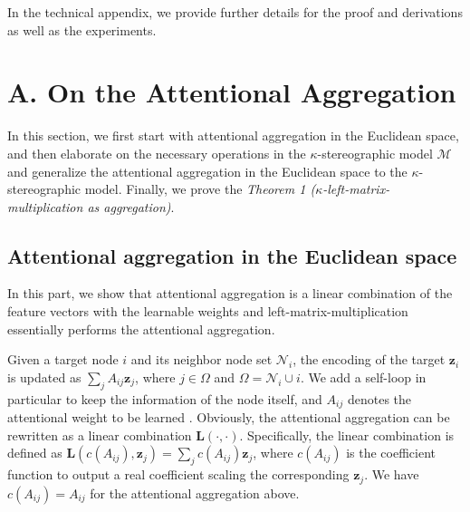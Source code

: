
In the technical appendix, we provide further details for the proof and derivations as well as the experiments.

\section{A. On the Attentional Aggregation}
In this section, we first start with attentional aggregation in the Euclidean space, 
and then elaborate on the necessary operations in the $\kappa$-stereographic model $\mathcal M$ and generalize the attentional aggregation in the Euclidean space to the $\kappa$-stereographic model.
Finally, we prove the \emph{Theorem 1 ($\kappa$-left-matrix-multiplication as aggregation)}.

\subsection{Attentional aggregation in the Euclidean space}
In this part, we show that attentional aggregation is a linear combination of the  feature vectors with the learnable weights and left-matrix-multiplication essentially performs the attentional aggregation.

Given a target node $i$ and its neighbor node set $\mathcal N_i$, 
the encoding of the target $\boldsymbol z_i$  is updated as 
$\sum\nolimits_j A_{ij}\boldsymbol z_j$,
where $j \in \Omega$ and $\Omega =\mathcal N_i \cup i$. We add a self-loop in particular to keep the information of the node itself, and $A_{ij}$ denotes the attentional weight to be learned \cite{WuPCLZY21,velickovic2018graph}.
Obviously, the attentional aggregation can be rewritten as a linear combination  $\boldsymbol L(\cdot, \cdot)$. 
Specifically, the linear combination is defined as $\boldsymbol L(c(A_{ij}), \boldsymbol z_j)=\sum\nolimits_j c(A_{ij})\boldsymbol z_j$,
where $c(A_{ij})$ is the coefficient function to output a real coefficient scaling the corresponding $\boldsymbol z_j$. We have $c(A_{ij})=A_{ij}$ for the attentional aggregation above.

